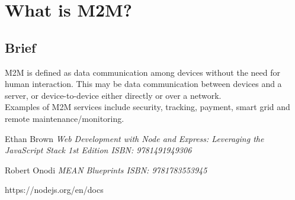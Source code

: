 \documentclass[12pt]{extreport}
\begin{document}
\tableofcontents %
\section{What is M2M?}
\subsection{Brief}
M2M is defined as data communication among devices without the need for human interaction. This may be data communication between devices and a server, or device-to-device either directly or over a network.\\
Examples of M2M services include security, tracking, payment, smart grid and remote maintenance/monitoring. 


\begin{thebibliography}{9}
Ethan Brown
\textit{Web Development with Node and Express: Leveraging the JavaScript Stack 1st Edition ISBN: 9781491949306}

Robert Onodi
\textit{MEAN Blueprints ISBN: 9781783553945}

\bibitem https://nodejs.org/en/docs

\end{thebibliography}
\end{document}
